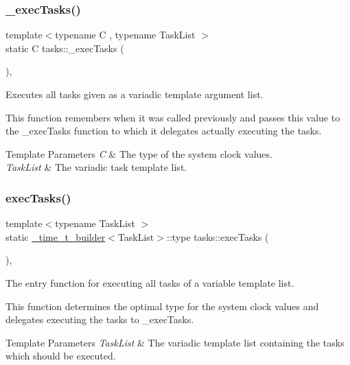 \subsubsection{\texorpdfstring{\+\_\+exec\+Tasks()}{\_execTasks()}\hspace{0.1cm}{\footnotesize\ttfamily [3/3]}}
{\footnotesize\ttfamily template$<$typename C , typename Task\+List $>$ \\
static C tasks\+::\+\_\+exec\+Tasks (\begin{DoxyParamCaption}{ }\end{DoxyParamCaption})\hspace{0.3cm}{\ttfamily [inline]}, {\ttfamily [static]}}



Executes all tasks given as a variadic template argument list. 

This function remembers when it was called previously and passes this value to the \+\_\+exec\+Tasks function to which it delegates actually executing the tasks.


\begin{DoxyTemplParams}{Template Parameters}
{\em C} & The type of the system clock values. \\
\hline
{\em Task\+List} & The variadic task template list. \\
\hline
\end{DoxyTemplParams}
\hypertarget{namespacetasks_a5c8debd51ffb3475e31ee7aa3c924eba}{}\label{namespacetasks_a5c8debd51ffb3475e31ee7aa3c924eba} 
\subsubsection{\texorpdfstring{exec\+Tasks()}{execTasks()}}
{\footnotesize\ttfamily template$<$typename Task\+List $>$ \\
static \hyperlink{structtasks_1_1__time__t__builder}{\+\_\+time\+\_\+t\+\_\+builder}$<$Task\+List$>$\+::type tasks\+::exec\+Tasks (\begin{DoxyParamCaption}\item[{Task\+List}]{ }\end{DoxyParamCaption})\hspace{0.3cm}{\ttfamily [inline]}, {\ttfamily [static]}}



The entry function for executing all tasks of a variable template list. 

This function determines the optimal type for the system clock values and delegates executing the tasks to \+\_\+exec\+Tasks.


\begin{DoxyTemplParams}{Template Parameters}
{\em Task\+List} & The variadic template list containing the tasks which should be executed. \\
\hline
\end{DoxyTemplParams}
